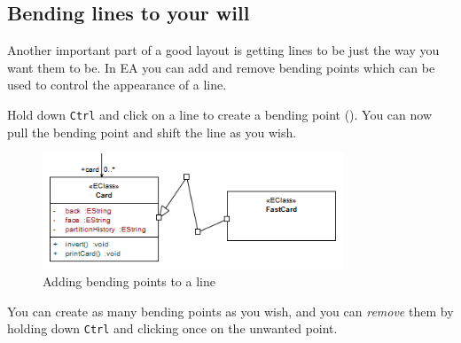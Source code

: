 \newpage

\subsection{Bending lines to your will}

Another important part of a good layout is getting lines to be just the way you want them to be. In EA you can add and remove bending points which can be used
to control the appearance of a line.

\begin{stepbystep}
\item Hold down \texttt{Ctrl} and click on a line to create a bending point (). You can now pull the bending point
and shift the line as you wish.
 
\begin{figure}[htbp]
\begin{center}
  \includegraphics[width=0.8\textwidth]{../../org.moflon.doc.handbook.05_miscellaneous/1_grokkingEA/02_bendingLines/ea_bendingLines}
  \caption{Adding bending points to a line}   
  \label{ea:bendLines}
\end{center}
\end{figure}

\item You can create as many bending points as you wish, and you can \emph{remove} them by holding down \texttt{Ctrl} and clicking once
on the unwanted point.
\end{stepbystep}
